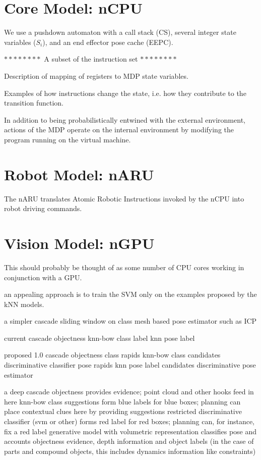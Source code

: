 \documentclass[conference]{IEEEtran}
\begin{document}
\section{Core Model: nCPU}
We use a pushdown automaton with a call stack (CS), several 
integer state variables ($S_i$), and an end effector pose cache (EEPC).

$********$ A subset of the instruction set $********$

Description of mapping of registers to MDP state variables.

Examples of how instructions change the state, i.e. how they
contribute to the transition function.

In addition to being probabilistically entwined with the external environment, 
actions of the MDP operate on the internal environment by modifying the program
running on the virtual machine. 


\section{Robot Model: nARU}
The nARU translates Atomic Robotic Instructions invoked by the nCPU 
into robot driving commands.


\section{Vision Model: nGPU}
This should probably be thought of as some number of CPU cores working
in conjunction with a GPU.

an appealing approach is to train the SVM only on the examples proposed by the kNN models.

a simpler cascade
sliding window on class
mesh based pose estimator such as ICP

current cascade
objectness
knn-bow class label
knn pose label


proposed 1.0 cascade
objectness
class rapids
knn-bow class candidates
discriminative classifier
pose rapids
knn pose label candidates
discriminative pose estimator

a deep cascade
objectness provides evidence; point cloud and other hooks feed in here
knn-bow class suggestions form blue labels for blue boxes; planning can 
place contextual clues here by providing suggestions
restricted discriminative classifier (svm or other) forms red label for 
red boxes; planning can, for instance, fix a red label 
generative model with volumetric representation classifies pose and accounts 
objectness evidence, depth information and object labels (in the case of parts 
and compound objects, this includes dynamics information like constraints)
\end{document}
